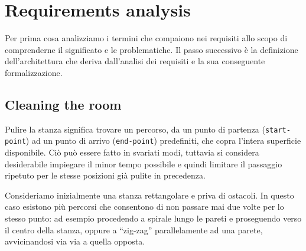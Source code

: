 \documentclass{../llncs}
\newcommand{\code}[1]{{\color{blue}\small{\texttt{#1}}}}
\newcommand{\labelsec}[1]{\label{sec:#1}}
\newcommand{\labelssec}[1]{\label{ssec:#1}}
\begin{document}
%

\section{Requirements analysis}
\labelsec{ReqAnalysis}
Per prima cosa analizziamo i termini che compaiono nei requisiti allo scopo di comprenderne il significato e le problematiche. Il passo successivo è la definizione dell'architettura che deriva dall'analisi dei requisiti e la sua conseguente formalizzazione.

\subsection{Cleaning the room}
\labelssec{cleaningRA}
Pulire la stanza significa trovare un percorso, da un punto di partenza (\code{start-point}) ad un punto di arrivo (\code{end-point}) predefiniti, che copra l'intera superficie disponibile. Ciò può essere fatto in svariati modi, tuttavia si considera desiderabile impiegare il minor tempo possibile e quindi limitare il passaggio ripetuto per le stesse posizioni già pulite in precedenza.

Consideriamo inizialmente una stanza rettangolare e priva di ostacoli. In questo caso esistono più percorsi che consentono di non passare mai due volte per lo stesso punto: ad esempio procedendo a spirale lungo le pareti e proseguendo verso il centro della stanza, oppure a ``zig-zag'' parallelamente ad una parete, avvicinandosi via via a quella opposta.
\end{document}
